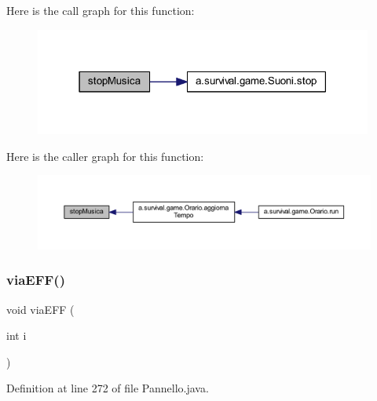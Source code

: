 Here is the call graph for this function\+:
\nopagebreak
\begin{figure}[H]
\begin{center}
\leavevmode
\includegraphics[width=315pt]{classa_1_1survival_1_1game_1_1_pannello_a2e8ba1ecd18a0f6434c051caa55bb9d3_cgraph}
\end{center}
\end{figure}
Here is the caller graph for this function\+:
\nopagebreak
\begin{figure}[H]
\begin{center}
\leavevmode
\includegraphics[width=350pt]{classa_1_1survival_1_1game_1_1_pannello_a2e8ba1ecd18a0f6434c051caa55bb9d3_icgraph}
\end{center}
\end{figure}
\mbox{\label{classa_1_1survival_1_1game_1_1_pannello_ace78d33408180273c794117936ab01e0}} 
\subsubsection{\texorpdfstring{via\+E\+F\+F()}{viaEFF()}}
{\footnotesize\ttfamily void via\+E\+FF (\begin{DoxyParamCaption}\item[{int}]{i }\end{DoxyParamCaption})}



Definition at line 272 of file Pannello.\+java.

